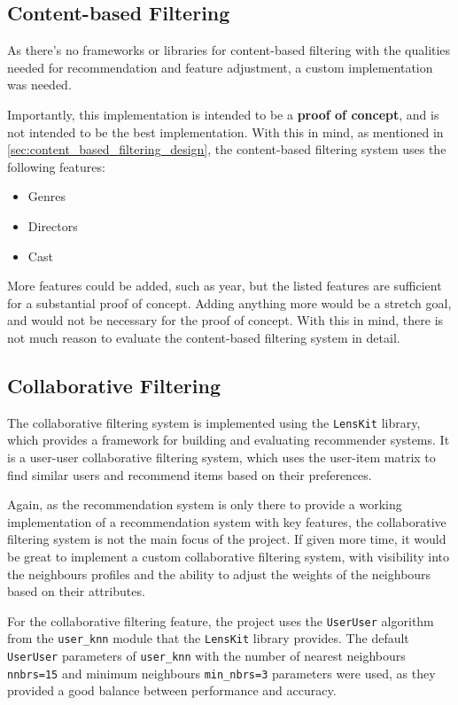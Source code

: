 \subsection{Content-based Filtering}
\label{sec:content_based_filtering_implementation}
As there's no frameworks or libraries for content-based filtering with the qualities needed for recommendation and feature adjustment, a custom implementation was needed.

Importantly, this implementation is intended to be a \textbf{proof of concept}, and is not intended to be the best implementation.
With this in mind, as mentioned in \cref{sec:content_based_filtering_design}, the content-based filtering system uses the following features:
\begin{itemize}
    \item Genres
    \item Directors
    \item Cast
\end{itemize}
More features could be added, such as year, but the listed features are sufficient for a substantial proof of concept.
Adding anything more would be a stretch goal, and would not be necessary for the proof of concept.
With this in mind, there is not much reason to evaluate the content-based filtering system in detail.

\subsection{Collaborative Filtering}
\label{sec:collaborative_filtering_implementation}
The collaborative filtering system is implemented using the \texttt{LensKit} library\cite{lenskit}, which provides a framework for building and evaluating recommender systems.
It is a user-user collaborative filtering system, which uses the user-item matrix to find similar users and recommend items based on their preferences.

Again, as the recommendation system is only there to provide a working implementation of a recommendation system with key features, the collaborative filtering system is not the main focus of the project.
If given more time, it would be great to implement a custom collaborative filtering system, with visibility into the neighbours profiles and the ability to adjust the weights of the neighbours based on their attributes.

For the collaborative filtering feature, the project uses the \texttt{UserUser} algorithm from the \texttt{user\_knn} module that the \texttt{LensKit} library provides.
The default \texttt{UserUser} parameters of \texttt{user\_knn} with the number of nearest neighbours \texttt{nnbrs=15} and minimum neighbours \texttt{min\_nbrs=3} parameters were used, as they provided a good balance between performance and accuracy.


